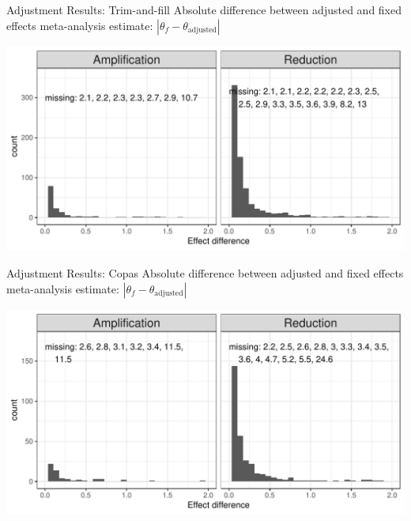 \documentclass[english]{beamer}\usepackage[]{graphicx}\usepackage[]{color}
\makeatletter
\def\maxwidth{ %
  \ifdim\Gin@nat@width>\linewidth
    \linewidth
  \else
    \Gin@nat@width
  \fi
}
\newenvironment{knitrout}{}{} %
\makeatother
\begin{document}
\begin{frame}[fragile]{Adjustment Results: Trim-and-fill}
Absolute difference between adjusted and fixed effects meta-analysis estimate: $|{\theta_f} - {\theta_{\textrm{adjusted}}}|$

\vspace{-3mm}
\begin{knitrout}
\color{fgcolor}
\includegraphics[width=\maxwidth]{figure/unnamed-chunk-12-1} 

\end{knitrout}
\end{frame}


\begin{frame}[fragile]{Adjustment Results: Copas}
Absolute difference between adjusted and fixed effects meta-analysis estimate: $|{\theta_f} - {\theta_{\textrm{adjusted}}}|$

\vspace{-3mm}
\begin{knitrout}
\color{fgcolor}
\includegraphics[width=\maxwidth]{figure/unnamed-chunk-13-1} 

\end{knitrout}
\end{frame}
\end{document}
